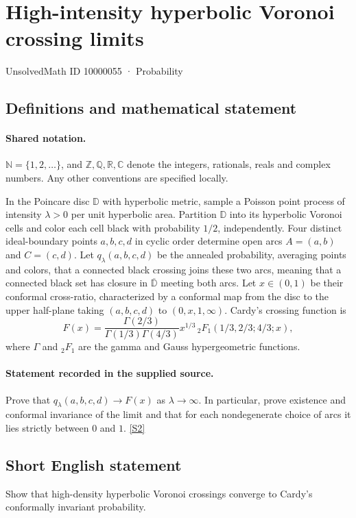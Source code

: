 \documentclass[11pt]{article}
\newcommand{\sref}[2]{\hyperlink{source:#1:#2}{[S#2]}}
\begin{document}
\setcounter{section}{10000054}
\section{High-intensity hyperbolic Voronoi crossing limits}\label{10000055}
{\small\sffamily UnsolvedMath ID 10000055 · Probability}
\subsection{Definitions and mathematical statement}

\paragraph{Shared notation.}$\mathbb N=\{1,2,\ldots\}$, and $\mathbb Z,\mathbb Q,\mathbb R,\mathbb C$ denote the integers, rationals, reals and complex numbers. Any other conventions are specified locally.


In the Poincare disc $\mathbb D$ with hyperbolic metric, sample a Poisson point process of intensity $\lambda>0$ per unit hyperbolic area. Partition $\mathbb D$ into its hyperbolic Voronoi cells and color each cell black with probability $1/2$, independently. Four distinct ideal-boundary points $a,b,c,d$ in cyclic order determine open arcs $A=(a,b)$ and $C=(c,d)$. Let $q_\lambda(a,b,c,d)$ be the annealed probability, averaging points and colors, that a connected black crossing joins these two arcs, meaning that a connected black set has closure in $\overline{\mathbb D}$ meeting both arcs.
Let $x\in(0,1)$ be their conformal cross-ratio, characterized by a conformal map from the disc to the upper half-plane taking $(a,b,c,d)$ to $(0,x,1,\infty)$. Cardy's crossing function is
\[F(x)=\frac{\Gamma(2/3)}{\Gamma(1/3)\Gamma(4/3)}x^{1/3}\,{}_2F_1(1/3,2/3;4/3;x),\]
where $\Gamma$ and ${}_2F_1$ are the gamma and Gauss hypergeometric functions.
\paragraph{Statement recorded in the supplied source.}
Prove that $q_\lambda(a,b,c,d)\to F(x)$ as $\lambda\to\infty$. In particular, prove existence and conformal invariance of the limit and that for each nondegenerate choice of arcs it lies strictly between $0$ and $1$. \sref{10000055}{2}
\subsection{Short English statement}
Show that high-density hyperbolic Voronoi crossings converge to Cardy's conformally invariant probability.
\end{document}
